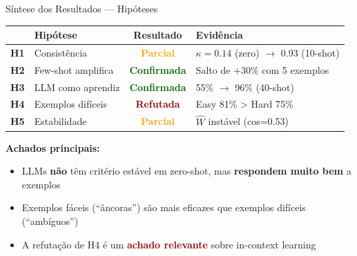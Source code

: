 \documentclass[aspectratio=169,12pt]{beamer}
\newcommand{\warn}[1]{\textcolor{darkred}{\textbf{#1}}}
\newcommand{\good}[1]{\textcolor{darkgreen}{\textbf{#1}}}
\begin{document}

\begin{frame}{Síntese dos Resultados --- Hipóteses}
\small
\begin{tabular}{c|l|c|l}
\toprule
& \textbf{Hipótese} & \textbf{Resultado} & \textbf{Evidência} \\
\midrule
\textbf{H1} & Consistência & \textcolor{orange}{\textbf{Parcial}} & $\kappa=0.14$ (zero) $\rightarrow$ 0.93 (10-shot) \\
\textbf{H2} & Few-shot amplifica & \good{Confirmada} & Salto de +30\% com 5 exemplos \\
\textbf{H3} & LLM como aprendiz & \good{Confirmada} & 55\% $\rightarrow$ 96\% (40-shot) \\
\textbf{H4} & Exemplos difíceis & \warn{Refutada} & Easy 81\% > Hard 75\% \\
\textbf{H5} & Estabilidade & \textcolor{orange}{\textbf{Parcial}} & $\hat{W}$ instável (cos=0.53) \\
\bottomrule
\end{tabular}

\vspace{0.3cm}
\textbf{Achados principais:}
\begin{itemize}
    \item LLMs \textbf{não} têm critério estável em zero-shot, mas \textbf{respondem muito bem} a exemplos
    \item Exemplos fáceis (``âncoras'') são mais eficazes que exemplos difíceis (``ambíguos'')
    \item A refutação de H4 é um \warn{achado relevante} sobre in-context learning
\end{itemize}
\end{frame}
\end{document}
